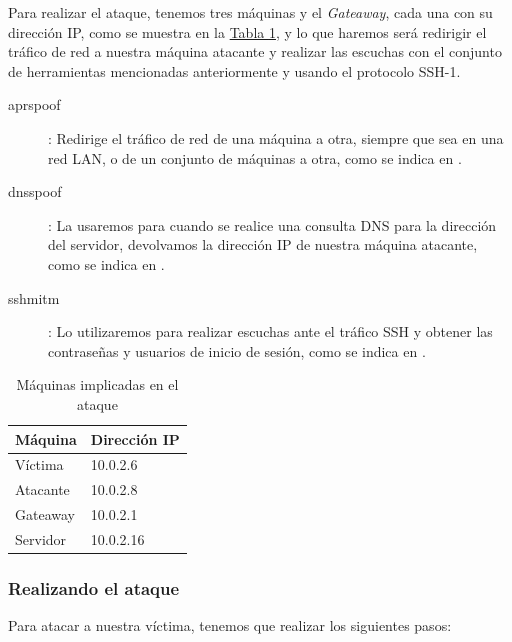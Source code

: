 \documentclass[10pt,a4paper,spanish]{article}
\begin{document}
Para realizar el ataque, tenemos tres máquinas y el \textit{Gateaway}, cada una con su dirección IP, como se muestra en la \hyperref[maquinas]{Tabla \ref*{maquinas}}, y lo que haremos será redirigir el tráfico de red a nuestra máquina atacante y realizar las escuchas con el conjunto de herramientas mencionadas anteriormente y usando el protocolo SSH-1.

\begin{description}
    \item [aprspoof]: Redirige el tráfico de red de una máquina a otra, siempre que sea en una red LAN, o de un conjunto de máquinas a otra, como se indica en \cite{arpspoof}.
    \item [dnsspoof]: La usaremos para cuando se realice una consulta DNS para la dirección del servidor, devolvamos la dirección IP de nuestra máquina atacante, como se indica en \cite{dnsspoof}.
    \item [sshmitm]: Lo utilizaremos para realizar escuchas ante el tráfico SSH y obtener las contraseñas y usuarios de inicio de sesión, como se indica en \cite{sshmitm}.
\end{description}

\begin{table}[H]
    \centering
    \begin{tabular}{|l|l|}
    \hline
    Máquina & Dirección IP \\
    \hline
    Víctima & 10.0.2.6 \\
    \hline
    Atacante & 10.0.2.8 \\
    \hline
    Gateaway & 10.0.2.1 \\
    \hline
    Servidor & 10.0.2.16 \\
    \hline
    \end{tabular}
    \caption{Máquinas implicadas en el ataque}
    \label{maquinas}
\end{table}

\subsubsection{Realizando el ataque}

Para atacar a nuestra víctima, tenemos que realizar los siguientes pasos:
\end{document}
